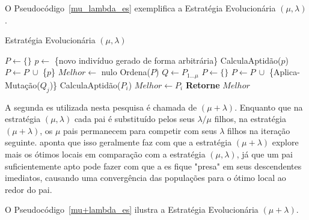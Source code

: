 O Pseudocódigo~\ref{mu_lambda_es} exemplifica a Estratégia Evolucionária 
$( \mu, \lambda )$.

\begin{algorithm}                      %
	\caption{Estratégia Evolucionária $( \mu, \lambda )$}          %
	\label{mu_lambda_es}                           %
	\begin{algorithmic}                    %
		\State $P \gets \{\} $
			\State $p \gets$ \{novo indivíduo gerado de forma arbitrária\}
			\State CalculaAptidão($p$)
			\State $P \gets P \ \cup $ \{$p$\} 
		\EndFor
		\State $Melhor \gets$ nulo
		\Repeat
			\State Ordena($P$) 
			\State $Q \gets P_{1...\mu}$ 
			\State $P \gets \{\}$
					\State $P \gets P \ \cup $ \{Aplica-Mutação($Q_{j}$)\}
				\EndFor
			\EndFor
				\State CalculaAptidão($P_{i}$)
					\State $Melhor \gets P_{i}$
				\EndIf
			\EndFor
		\State \textbf{Retorne} $Melhor$
		\EndProcedure
	\end{algorithmic}
\end{algorithm}

A segunda \ac{es} utilizada nesta pesquisa é chamada de $( \mu + \lambda)$. 
Enquanto que na estratégia $( \mu, \lambda )$ cada pai é substituído pelos seus 
$ \lambda / \mu $ filhos, na estratégia $( \mu + \lambda )$, os $\mu$ pais 
permanecem para competir com seus $ \lambda$ filhos na iteração seguinte. 
\citep{Luke2013Metaheuristics} aponta que isso geralmente faz com que a 
estratégia $( \mu + \lambda )$ explore mais os ótimos locais em comparação com 
a estratégia $( \mu, \lambda )$, já que um pai suficientemente apto pode fazer 
com que a \ac{es} fique "presa" em seus descendentes imediatos, causando uma 
convergência das populações para o ótimo local ao redor do pai.

O Pseudocódigo~\ref{mu+lambda_es} ilustra a Estratégia Evolucionária 
$( \mu + \lambda )$.

